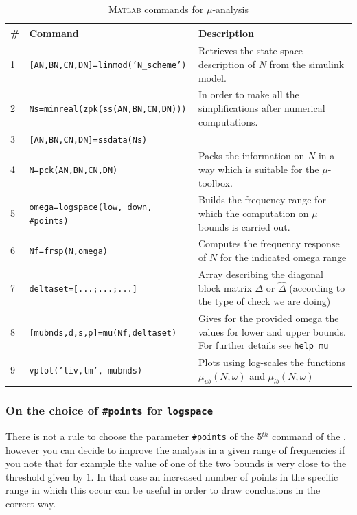 \documentclass[a4paper, 12pt]{article}
\begin{document}
\begin{table}[h]
    \centering
    \begin{tabular}{p{0.5cm} p{7cm} p{8cm}}
        \textbf{\#}&\textbf{Command}&\textbf{Description}\\
        \midrule[1.5pt]
        1&\texttt{[AN,BN,CN,DN]=linmod('N\_scheme')}&{Retrieves the state-space description of $N$ from the simulink model.}\\
        \midrule
        2&\texttt{Ns=minreal(zpk(ss(AN,BN,CN,DN)))}&{In order to make all the simplifications after numerical computations.}\\
        3&\texttt{[AN,BN,CN,DN]=ssdata(Ns)}&\\
        \midrule
        4&\texttt{N=pck(AN,BN,CN,DN)}&{Packs the information on $N$ in a way which is suitable for the $\mu$-toolbox.}\\
        \midrule
        5&\texttt{omega=logspace(low, down, \#points)}&{Builds the frequency range for which the computation on $\mu$ bounds is carried out.}\\
        \midrule
        6&\texttt{Nf=frsp(N,omega)}&{Computes the frequency response of $N$ for the indicated omega range}\\
        \midrule
        7&\texttt{deltaset=[...;...;...]}&{Array describing the diagonal block matrix $\Delta$ or $\hat{\Delta}$} (according to the type of check we are doing)\\
        \midrule
        8&\texttt{[mubnds,d,s,p]=mu(Nf,deltaset)}&{Gives for the provided omega the values for lower and upper bounds. For further details see \texttt{help mu}}\\
        \midrule
        9&\texttt{vplot('liv,lm', mubnds)}&{Plots using log-scales the functions $\mu_{ub}(N,\omega)$ and $\mu_{lb}(N,\omega)$ }
        
    \end{tabular}
    \caption{\textsc{Matlab} commands for $\mu$-analysis}
    \label{tab:mu_commands}
\end{table}

\subsubsection{On the choice of \texttt{\#points} for \texttt{logspace}}
There is not a rule to choose the parameter \texttt{\#points} of the 5$^{th}$ command of the , however you can decide to improve the analysis in a given range of frequencies if you note that for example the value of one of the two bounds is very close to the threshold given by $1$. In that case an increased number of points in the specific range in which this occur can be useful in order to draw conclusions in the correct way.
\end{document}
